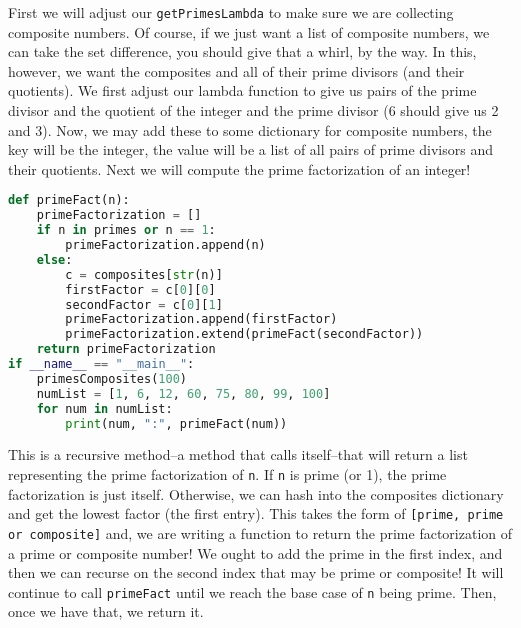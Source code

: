\documentclass[11pt, twoside, reqno]{book}
\begin{document}
First we will adjust our \texttt{getPrimesLambda} to make sure we are collecting composite numbers. Of course, if we just want a list of composite numbers, we can take the set difference, you should give that a whirl, by the way. In this, however, we want the composites and all of their prime divisors (and their quotients). We first adjust our lambda function to give us pairs of the prime divisor and the quotient of the integer and the prime divisor (6 should give us 2 and 3). Now, we may add these to some dictionary for composite numbers, the key will be the integer, the value will be a list of all pairs of prime divisors and their quotients. Next we will compute the prime factorization of an integer!
\begin{lstlisting}[language=Python]
def primeFact(n):
    primeFactorization = []
    if n in primes or n == 1:
        primeFactorization.append(n)
    else:
        c = composites[str(n)]
        firstFactor = c[0][0]
        secondFactor = c[0][1]
        primeFactorization.append(firstFactor)
        primeFactorization.extend(primeFact(secondFactor))
    return primeFactorization
if __name__ == "__main__":
    primesComposites(100)
    numList = [1, 6, 12, 60, 75, 80, 99, 100]
    for num in numList:
        print(num, ":", primeFact(num))
\end{lstlisting}

This is a recursive method--a method that calls itself--that will return a list representing the prime factorization of \texttt{n}. If \texttt{n} is prime (or 1), the prime factorization is just itself. Otherwise, we can hash into the composites dictionary and get the lowest factor (the first entry). This takes the form of \texttt{[prime, prime or composite]} and, we are writing a function to return the prime factorization of a prime or composite number! We ought to add the prime in the first index, and then we can recurse on the second index that may be prime or composite! It will continue to call \texttt{primeFact} until we reach the base case of \texttt{n} being prime. Then, once we have that, we return it.
\end{document}
